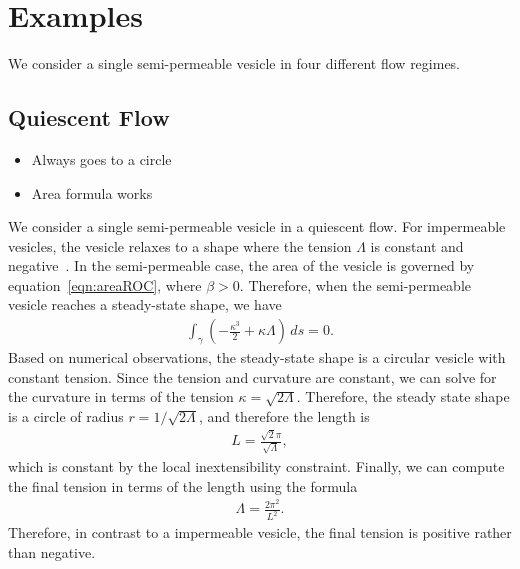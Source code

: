 \documentclass[aps,prl,showpacs]{revtex4}
\begin{document}


\section{Examples}
We consider a single semi-permeable vesicle in four different flow
regimes.

\subsection{Quiescent Flow}
\begin{itemize}
  \item Always goes to a circle
  \item Area formula works
\end{itemize}

We consider a single semi-permeable vesicle in a quiescent flow. For
impermeable vesicles, the vesicle relaxes to a shape where the tension
$\Lambda$ is constant and negative~\cite{kra-win-sei-lip1996}. In the
semi-permeable case, the area of the vesicle is governed by
equation~\eqref{eqn:areaROC}, where $\beta > 0$. Therefore, when the
semi-permeable vesicle reaches a steady-state shape, we have
\begin{align}
  \int_{\gamma} \left(-\frac{\kappa^3}{2} + \kappa \Lambda \right) \, ds
  = 0.
\end{align}
Based on numerical observations, the steady-state shape is a circular
vesicle with constant tension. Since the tension and curvature are
constant, we can solve for the curvature in terms of the tension $\kappa
= \sqrt{2\Lambda}$. Therefore, the steady state shape is a circle of
radius $r = 1/\sqrt{2\Lambda}$, and therefore the length is
\begin{align}
  L = \frac{\sqrt{2}\pi}{\sqrt{\Lambda}},
\end{align}
which is constant by the local inextensibility constraint. Finally, we
can compute the final tension in terms of the length using the formula
\begin{align}
  \Lambda = \frac{2\pi^2}{L^2}.
  \label{eqn:finalTension}
\end{align}
Therefore, in contrast to a impermeable vesicle, the final tension is
positive rather than negative.
\end{document}
